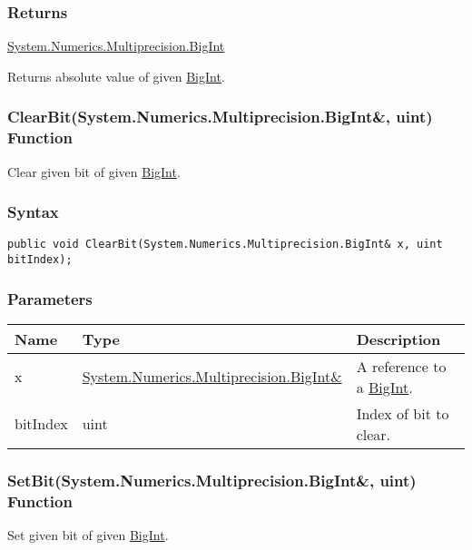 \documentclass[a4paper,oneside,11.000000pt]{book}
\begin{document}
\subsubsection*{Returns}
\hyperlink{System.Numerics.Multiprecision.BigInt}{System.\-Numerics.\-Multiprecision.\-BigInt}
\begin{flushleft}
Returns absolute value of given \hyperlink{System.Numerics.Multiprecision.BigInt}{BigInt}.

\end{flushleft}
\clearpage

\hypertarget{System.Numerics.Multiprecision.ClearBit.R.System.Numerics.Multiprecision.BigInt.uint}{\subsubsection*{ClearBit(System.Numerics.Multiprecision.BigInt\&, uint) Function}}
\begin{flushleft}
Clear given bit of given \hyperlink{System.Numerics.Multiprecision.BigInt}{BigInt}.

\end{flushleft}
\subsubsection*{Syntax}
\texttt{public void ClearBit(System.Numerics.Multiprecision.BigInt\& x, uint bitIndex);}
\subsubsection*{Parameters}
\begin{flushleft}
\begin{supertabular}[l]{!{\raggedright}p{1.94573cm}!{\raggedright}p{7.92093cm}!{\raggedright}p{4.93333cm}}
\textbf{Name}
& \textbf{Type}
& \textbf{Description}
\\
\hline
x
& \hyperlink{System.Numerics.Multiprecision.BigInt}{System.\-Numerics.\-Multiprecision.\-BigInt\&\-}
& A reference to a \hyperlink{System.Numerics.Multiprecision.BigInt}{BigInt}.

\\
bitIndex
& uint
& Index of bit to clear.

\\
\end{supertabular}

\end{flushleft}
\clearpage

\hypertarget{System.Numerics.Multiprecision.SetBit.R.System.Numerics.Multiprecision.BigInt.uint}{\subsubsection*{SetBit(System.Numerics.Multiprecision.BigInt\&, uint) Function}}
\begin{flushleft}
Set given bit of given \hyperlink{System.Numerics.Multiprecision.BigInt}{BigInt}.

\end{flushleft}
\end{document}
